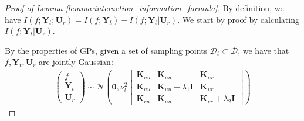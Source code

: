 \begin{proof}[Proof of Lemma \ref{lemma:interaction_information_formula}]
By definition, we have $I (f; \mathbf{Y}_t; \mathbf{U}_r) = I(f; \mathbf{Y}_t) - I (f; \mathbf{Y}_t \rvert \mathbf{U}_r)$. We start by proof by calculating $I (f; \mathbf{Y}_t \rvert \mathbf{U}_r)$.

By the properties of GPs, given a set of sampling points $\mathcal{D}_t\subset \mathcal{D}$, we have that $f, \mathbf{Y}_t, \mathbf{U}_r$ are jointly Gaussian:
\begin{align}
\label{Eqn:joint_gauss_3_variables}
\left(
\begin{aligned}
    f\\
    \mathbf{Y}_t\\
    \mathbf{U}_r
\end{aligned}
\right) \sim \mathcal{N} \left(\mathbf{0}, \nu_t^2 \begin{bmatrix}
    \mathbf{K}_{uu} & \mathbf{K}_{uu} & \mathbf{K}_{ur} \\
    \mathbf{K}_{uu} & \mathbf{K}_{uu} + \lambda_1 \mathbf{I} & \mathbf{K}_{ur} \\
    \mathbf{K}_{ru} & \mathbf{K}_{uu} & \mathbf{K}_{rr} + \lambda_2 \mathbf{I}
\end{bmatrix} \right)    
\end{align} 



\end{proof}
